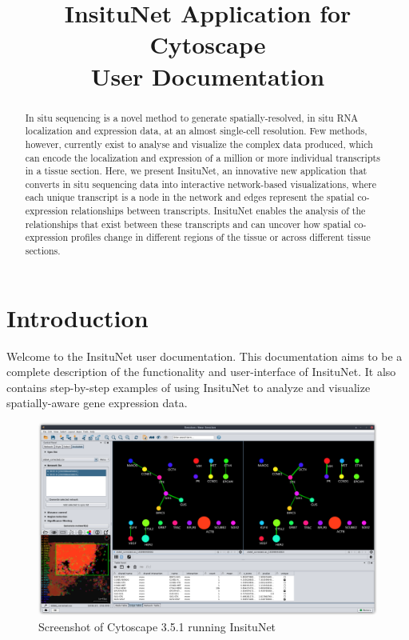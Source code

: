 \documentclass[a4paper,12pt]{article}
\title{InsituNet Application for Cytoscape \\ \large User Documentation}
\begin{document}
\maketitle
\begin{abstract}
In situ sequencing is a novel method to generate spatially-resolved, in situ RNA localization and expression data, at an almost single-cell resolution. Few methods, however, currently exist to analyse and visualize the complex data produced, which can encode the localization and expression of a million or more individual transcripts in a tissue section. Here, we present InsituNet, an innovative new application that converts in situ sequencing data into interactive network-based visualizations, where each unique transcript is a node in the network and edges represent the spatial co-expression relationships between transcripts. InsituNet enables the analysis of the relationships that exist between these transcripts and can uncover how spatial co-expression profiles change in different regions of the tissue or across different tissue sections. 
\end{abstract}
\clearpage

\tableofcontents

\clearpage

\section{Introduction}
Welcome to the InsituNet user documentation. This documentation aims to be a complete description of the functionality and user-interface of InsituNet. It also contains step-by-step examples of using InsituNet to analyze and visualize spatially-aware gene expression data.

\begin{figure}[htb]
	\caption{Screenshot of Cytoscape 3.5.1 running InsituNet}\label{fig:shot}
	\centering
	\includegraphics[width=\textwidth]{shot_1-shadow}
\end{figure}
\end{document}
